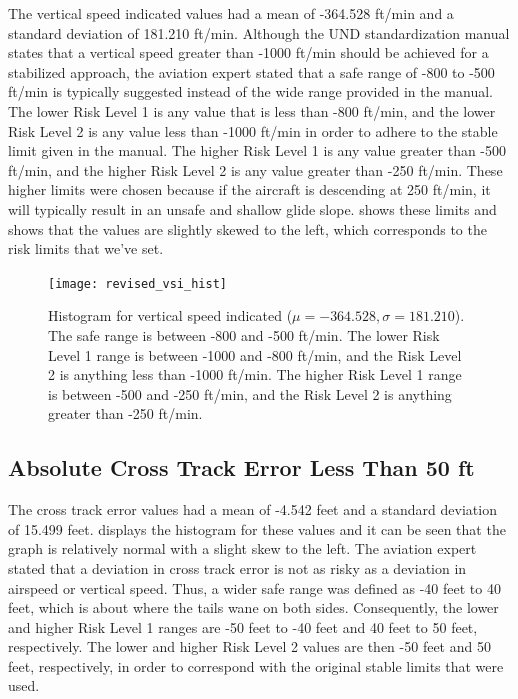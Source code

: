     	The vertical speed indicated values had a mean of -364.528 ft/min and a standard deviation of 181.210 ft/min.  Although the UND standardization manual states that a vertical speed greater than -1000 ft/min should be achieved for a stabilized approach, the aviation expert stated that a safe range of -800 to -500 ft/min is typically suggested instead of the wide range provided in the manual.  The lower Risk Level 1 is any value that is less than -800 ft/min, and the lower Risk Level 2 is any value less than -1000 ft/min in order to adhere to the stable limit given in the manual.  The higher Risk Level 1 is any value greater than -500 ft/min, and the higher Risk Level 2 is any value greater than -250 ft/min.  These higher limits were chosen because if the aircraft is descending at 250 ft/min, it will typically result in an unsafe and shallow glide slope.   shows these limits and shows that the values are slightly skewed to the left, which corresponds to the risk limits that we've set.

		\begin{figure}
			\centering
            \texttt{[image: revised\_vsi\_hist]}
            \caption{Histogram for vertical speed indicated ($\mu = -364.528, \sigma = 181.210$).  The safe range is between -800 and -500 ft/min.  The lower Risk Level 1 range is between -1000 and -800 ft/min, and the Risk Level 2 is anything less than -1000 ft/min.  The higher Risk Level 1 range is between -500 and -250 ft/min, and the Risk Level 2 is anything greater than -250 ft/min.}
            \label{fig:revised_vsi_hist}
		\end{figure}



    \subsection{Absolute Cross Track Error Less Than 50 ft}
    
    	The cross track error values had a mean of -4.542 feet and a standard deviation of 15.499 feet.   displays the histogram for these values and it can be seen that the graph is relatively normal with a slight skew to the left.  The aviation expert stated that a deviation in cross track error is not as risky as a deviation in airspeed or vertical speed.  Thus, a wider safe range was defined as -40 feet to 40 feet, which is about where the tails wane on both sides.  Consequently, the lower and higher Risk Level 1 ranges are -50 feet to -40 feet and 40 feet to 50 feet, respectively.  The lower and higher Risk Level 2 values are then -50 feet and 50 feet, respectively, in order to correspond with the original stable limits that were used.
        
